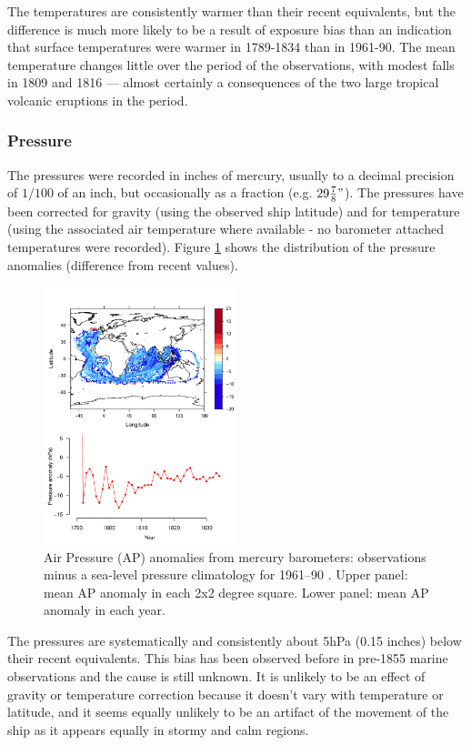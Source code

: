 \documentclass[CP]{copernicus}
\begin{document}
The temperatures are consistently warmer than their recent equivalents, but the difference is much more likely to be a result of exposure bias than an indication that surface temperatures were warmer in 1789-1834 than in 1961-90. The mean temperature changes little over the period of the observations, with modest falls in 1809 and 1816 --- almost certainly a consequences of the two large tropical volcanic eruptions in the period.

\subsubsection{Pressure}
\label{Spressure}

The pressures were recorded in inches of mercury, usually to a decimal precision of $1/100$ of an inch, but occasionally as a fraction (e.g. $29 {7\over8}"$). The pressures have been corrected for gravity (using the observed ship latitude) and for temperature (using the associated air temperature where available - no barometer attached temperatures were recorded). Figure \ref{pwat2} shows the distribution of the pressure anomalies (difference from recent values).
\begin{figure}[!hbp]
\begin{center}
\includegraphics[angle=0, width=0.5\textwidth]{fig6.pdf}
\caption{Air Pressure (AP) anomalies from mercury barometers: observations minus a sea-level pressure climatology for 1961--90 \citep{allan06meansealevelpressure}. Upper panel: mean AP anomaly in each 2x2 degree square. Lower panel: mean AP anomaly in each year.}
\label{pwat2}
\end{center}
\end{figure}
The pressures are systematically and consistently about 5hPa (0.15 inches) below their recent equivalents. This bias has been observed before in pre-1855 marine observations \citep{ansell06emulate,brohan10corral} and the cause is still unknown. It is unlikely to be an effect of gravity or temperature correction because it doesn't vary with temperature or latitude, and it seems equally unlikely to be an artifact of the movement of the ship as it appears equally in stormy and calm regions.
\end{document}
